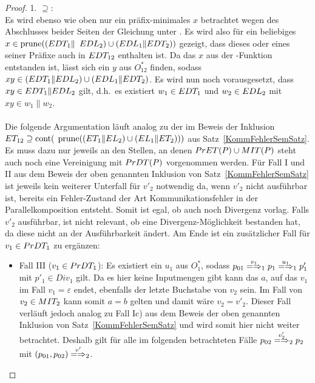 \begin{proof}
  1. \glqq$\supseteq$\grqq{}:\\
  Es wird ebenso wie oben nur ein präfix-minimales $x$ betrachtet wegen des
  Abschlusses beider Seiten der Gleichung unter \cont{}. Es wird also für ein
  beliebiges $x\in\mathrm{prune} ((EDT _1\|$ $EDL _2)\cup (EDL _1\|EDT _2))$ gezeigt,
  dass dieses oder eines seiner Präfixe auch in $EDT _{12}$ enthalten ist. Da
  das $x$ aus der \prune{}-Funktion entstanden ist, lässt sich ein $y$ aus
  $O^*_{12}$ finden, sodass $xy\in (EDT _1\|EDL _2)\cup (EDL _1\|EDT _2)$.
  Es wird nun noch vorausgesetzt, dass \oBdA{} $xy\in EDT _1\|EDL _2$ gilt,
  d.h.\ es existiert $w_1\in EDT _1$ und $w_2\in EDL _2$ mit $xy\in
  w_1\|w_2$.\\
  \\
  Die folgende Argumentation läuft analog zu der im Beweis der Inklusion $ET
  _{12} \supseteq \mathrm{cont}($ $\mathrm{prune} ((ET _1\|EL _2)\cup (EL _1\|ET _2)))$ aus
  Satz~\ref{KommFehlerSemSatz}. Es muss dazu nur jeweils an den Stellen, an
  denen $PrET (P)\cup MIT (P)$ steht auch noch eine Vereinigung mit $PrDT
  (P)$ vorgenommen werden. Für Fall I und II aus dem Beweis der oben genannten
  Inklusion von Satz~\ref{KommFehlerSemSatz} ist jeweils kein weiterer
  Unterfall für $v'_2$ notwendig da, wenn $v'_2$ nicht ausführbar ist, bereits
  ein Fehler-Zustand der Art Kommunikationsfehler in der Parallelkomposition
  entsteht. Somit ist egal, ob auch noch Divergenz vorlag. Falls $v'_2$
  ausführbar, ist nicht relevant, ob eine Divergenz-Möglichkeit bestanden hat,
  da diese nicht an der Ausführbarkeit ändert. Am Ende ist ein zusätzlicher
  Fall für $v_1\in PrDT _1$ zu ergänzen:
  \begin{itemize}
    \item Fall III ($v_1\in PrDT _1$): Es existiert ein $u_1$ aus $O^*_1$,
      sodass $p_{01}\weakmay[v_1]_1 p_1\weakmay[u_1]_1 p'_1$ mit $p'_1\in Div
      _1$ gilt. Da es hier keine Inputmengen gibt kann das $a$, auf das $v_1$
      im Fall $v_1=\varepsilon$ endet, ebenfalls der letzte Buchstabe von $v_2$
      sein. Im Fall von $v_2\in MIT _2$ kann somit $a=b$ gelten und damit wäre
      $v_2=v'_2$. Dieser Fall verläuft jedoch analog zu Fall Ic) aus dem Beweis
     der oben genannten Inklusion von Satz~\ref{KommFehlerSemSatz} und wird
      somit hier nicht weiter betrachtet. Deshalb gilt für alle im folgenden
      betrachteten Fälle $p_{02}\weakmay[v'_2]_2 p_2$ mit $(p_{01},p_{02})
      \weakmay[v']_2$.
      \begin{itemize}

\end{itemize}
\end{itemize}
\end{proof}
